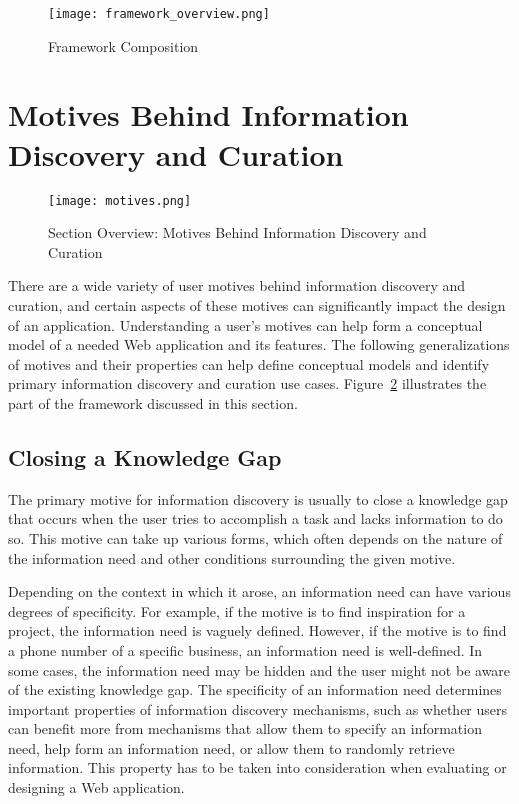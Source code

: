 \begin{figure}[ht!]
	\noindent
	\centering
	\texttt{[image: framework\_overview.png]}
	\caption{Framework Composition}
	\label{fig:framework_overview} 
\end{figure}
\clearpage

{\section{Motives Behind Information Discovery and Curation}

\label{section:motives}
\begin{figure}[ht!]
	\noindent
	\centering
	\texttt{[image: motives.png]}
	\caption{Section Overview: Motives Behind Information Discovery and Curation}
	\label{fig:motives} 
\end{figure}

There are a wide variety of user motives behind information discovery and curation, and certain aspects of these motives can significantly impact the design of an application. Understanding a user's motives can help form a conceptual model of a needed Web application and its features. The following generalizations of motives and their properties can help define conceptual models and identify primary information discovery and curation use cases. Figure~\ref{fig:motives} illustrates the part of the framework discussed in this section.  

{\subsection{Closing a Knowledge Gap}
The primary motive for information discovery is usually to close a knowledge gap that occurs when the user tries to accomplish a task and lacks information to do so. This motive can take up various forms, which often depends on the nature of the information need and other conditions surrounding the given motive.        

Depending on the context in which it arose, an information need can have various degrees of specificity. For example, if the motive is to find inspiration for a project, the information need is vaguely defined. However, if the motive is to find a phone number of a specific business, an information need is well-defined. In some cases, the information need may be hidden and the user might not be aware of the existing knowledge gap. The specificity of an information need determines important properties of information discovery mechanisms, such as whether users can benefit more from mechanisms that allow them to specify an information need, help form an information need, or allow them to randomly retrieve information. This property has to be taken into consideration when evaluating or designing a Web application. 

}}

